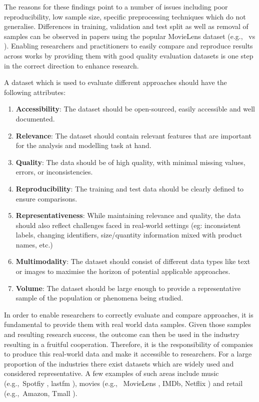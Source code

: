 \documentclass[manuscript]{acmart}
\newcommand{\eg}{e.g.,~}
\begin{document}
The reasons for these findings point to a number of issues including
poor reproducibility, low sample size, specific preprocessing techniques which
do not generalise. Differences in training, validation
and test split as well as removal of samples can be observed in papers
using the popular MovieLens dataset (\eg  \cite{sun2019} vs
 \cite{ludewig2018}). Enabling researchers and practitioners to
easily compare and reproduce results across works by providing them with
good quality evaluation datasets is one step in the correct direction to
enhance research.

A dataset which is used to evaluate different approaches should have the
following attributes:
\begin{enumerate}[topsep=0pt]
\item \textbf{Accessibility}: The dataset should be open-sourced, easily
accessible and well documented.
\item \textbf{Relevance}: The dataset should contain relevant features that are
important for the analysis and modelling task at hand.
\item \textbf{Quality}: The data should be of high quality, with minimal missing
values, errors, or inconsistencies.
\item \textbf{Reproducibility}: The training and test data should be clearly
defined to ensure comparisons. 
\item \textbf{Representativeness}: While maintaining relevance and quality, the data 
should also reflect challenges faced in real-world settings (eg: inconsistent labels, 
changing identifiers, size/quantity information mixed with product names, etc.)
\item \textbf{Multimodality}: The dataset should consist of different data types
like text or images to maximise the horizon of potential applicable
approaches.
\item \textbf{Volume}: The dataset should be large enough to provide a
representative sample of the population or phenomena being studied.
\end{enumerate}
In order to enable researchers to correctly evaluate and compare
approaches, it is fundamental to provide them with real world data
samples. Given those samples and resulting research success, the outcome
can then be used in the industry resulting in a fruitful cooperation.
Therefore, it is the responsibility of companies to produce this
real-world data and make it accessible to researchers.  For a large
proportion of the industries there exist datasets which are
widely used and considered representative. A few examples of such areas
include music (\eg Spotfiy \cite{spotify_dataset},
lastfm \cite{Bertin-Mahieux2011}), movies (\eg
MovieLens \cite{harper2015movielens}, IMDb\cite{imdb_dataset},
Netflix \cite{netflix}) and retail (\eg Amazon\cite{ni2019},
Tmall \cite{tmall_dataset}). 
\end{document}
